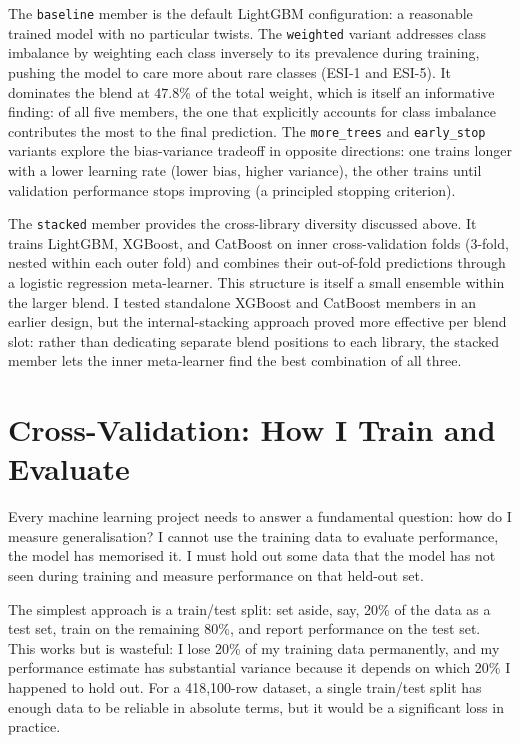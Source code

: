 The \texttt{baseline} member is the default LightGBM configuration: a reasonable trained model with no particular twists. The \texttt{weighted} variant addresses class imbalance by weighting each class inversely to its prevalence during training, pushing the model to care more about rare classes (ESI-1 and ESI-5). It dominates the blend at $47.8\%$ of the total weight, which is itself an informative finding: of all five members, the one that explicitly accounts for class imbalance contributes the most to the final prediction. The \texttt{more\_trees} and \texttt{early\_stop} variants explore the bias-variance tradeoff in opposite directions: one trains longer with a lower learning rate (lower bias, higher variance), the other trains until validation performance stops improving (a principled stopping criterion).

The \texttt{stacked} member provides the cross-library diversity discussed above. It trains LightGBM, XGBoost, and CatBoost on inner cross-validation folds (3-fold, nested within each outer fold) and combines their out-of-fold predictions through a logistic regression meta-learner. This structure is itself a small ensemble within the larger blend. I tested standalone XGBoost and CatBoost members in an earlier design, but the internal-stacking approach proved more effective per blend slot: rather than dedicating separate blend positions to each library, the stacked member lets the inner meta-learner find the best combination of all three.

\section{Cross-Validation: How I Train and Evaluate}

Every machine learning project needs to answer a fundamental question: how do I measure generalisation? I cannot use the training data to evaluate performance, the model has memorised it. I must hold out some data that the model has not seen during training and measure performance on that held-out set.

The simplest approach is a train/test split: set aside, say, 20\% of the data as a test set, train on the remaining 80\%, and report performance on the test set. This works but is wasteful: I lose 20\% of my training data permanently, and my performance estimate has substantial variance because it depends on which 20\% I happened to hold out. For a 418,100-row dataset, a single train/test split has enough data to be reliable in absolute terms, but it would be a significant loss in practice.

